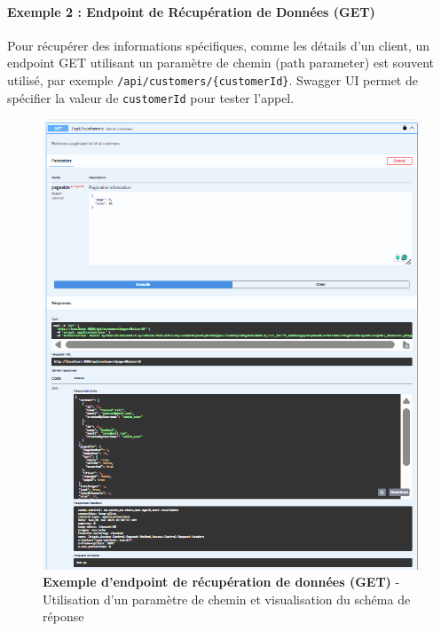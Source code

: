 \documentclass[10pt]{article}
\begin{document}
\paragraph{Exemple 2 : Endpoint de Récupération de Données (GET)}
Pour récupérer des informations spécifiques, comme les détails d'un client, un endpoint GET utilisant un paramètre de chemin (path parameter) est souvent utilisé, par exemple \texttt{/api/customers/\{customerId\}}. Swagger UI permet de spécifier la valeur de \texttt{customerId} pour tester l'appel.

\begin{figure}[H]
    \centering
    \begin{tcolorbox}[
        width=0.9\textwidth,
        colback=white,
        colframe=secondarygreen,
        boxrule=1pt,
        arc=5pt,
        boxsep=5pt
    ]
        \includegraphics[width=\textwidth]{screenshots/swagger_get_data_endpoint.png}
    \end{tcolorbox}
    \caption{\textbf{Exemple d'endpoint de récupération de données (GET)} - Utilisation d'un paramètre de chemin et visualisation du schéma de réponse}
    \label{fig:swagger_get_data_endpoint}
\end{figure}
\end{document}
